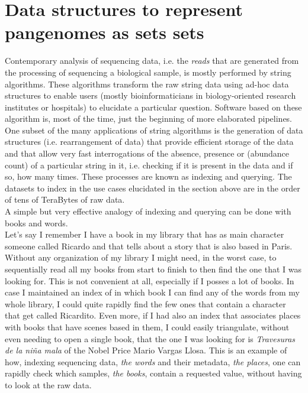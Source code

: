 \section{Data structures to represent pangenomes as sets \kmer sets}
Contemporary analysis of sequencing data, i.e. the \emph{reads} that are generated from the processing of sequencing a biological sample, is mostly performed by string algorithms. These algorithms transform the raw string data using ad-hoc data structures to enable users (mostly bioinformaticians in biology-oriented research institutes or hospitals) to elucidate a particular question. Software based on these algorithm is, most of the time, just the beginning of more elaborated pipelines. \\
One subset of the many applications of string algorithms is the generation of data structures (i.e. rearrangement of data) that provide efficient storage of the data and that allow very fast interrogations of the absence, presence or (abundance count) of a particular string in it, i.e. checking if it is present in the data and if so, how many times. These processes are known as indexing and querying. The datasets to index in the use cases elucidated in the section above are in the order of tens of TeraBytes of raw data.\\
A simple but very effective analogy of indexing and querying can be done with books and words. \\
Let's say I remember I have a book in my library that has as main character someone called Ricardo and that tells about a story that is also based in Paris. Without any organization of my library I might need, in the worst case, to sequentially read all my books from start to finish to then find the one that I was looking for. This is not convenient at all, especially if I posses a lot of books. In case I maintained an index of in which book I can find any of the words from my whole library, I could quite rapidly find the few ones that contain a character that get called Ricardito. Even more, if I had also an index that associates places with books that have scenes based in them, I could easily triangulate, without even needing to open a single book, that the one I was looking for is \emph{Travesuras de la niña mala} of the Nobel Price  Mario Vargas Llosa.
This is an example of how, indexing sequencing data, \emph{the words} and their metadata, \emph{the places}, one can rapidly check which samples, \emph{the books}, contain a requested value, without having to look at the raw data.

